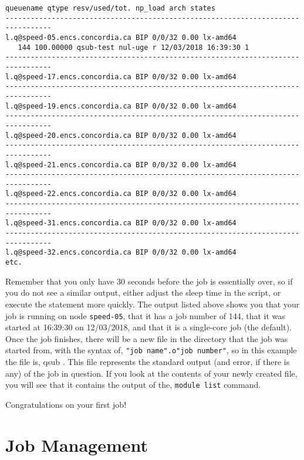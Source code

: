 \documentclass{easychair}
\begin{document}
\small
\begin{verbatim}
queuename qtype resv/used/tot. np_load arch states
--------------------------------------------------------------------------------- 
l.q@speed-05.encs.concordia.ca BIP 0/0/32 0.00 lx-amd64
   144 100.00000 qsub-test nul-uge r 12/03/2018 16:39:30 1 
--------------------------------------------------------------------------------- 
l.q@speed-17.encs.concordia.ca BIP 0/0/32 0.00 lx-amd64  
--------------------------------------------------------------------------------- 
l.q@speed-19.encs.concordia.ca BIP 0/0/32 0.00 lx-amd64  
--------------------------------------------------------------------------------- 
l.q@speed-20.encs.concordia.ca BIP 0/0/32 0.00 lx-amd64  
--------------------------------------------------------------------------------- 
l.q@speed-21.encs.concordia.ca BIP 0/0/32 0.00 lx-amd64  
--------------------------------------------------------------------------------- 
l.q@speed-22.encs.concordia.ca BIP 0/0/32 0.00 lx-amd64  
--------------------------------------------------------------------------------- 
l.q@speed-31.encs.concordia.ca BIP 0/0/32 0.00 lx-amd64  
--------------------------------------------------------------------------------- 
l.q@speed-32.encs.concordia.ca BIP 0/0/32 0.00 lx-amd64  
etc.
\end{verbatim}
\normalsize

Remember that you only have 30 seconds before the job is essentially over, so if you do not see a similar output, either adjust the sleep time in the script, or execute the  statement more quickly. The  output listed above shows you that your job is 
running on node \texttt{speed-05}, that it has a job number of 144, that it was started at 16:39:30 on 12/03/2018, and that it is a single-core job (the default).  
Once the job finishes, there will be a new file in the directory that the job was started  from, with the syntax of, \texttt{"job name".o"job number"}, so in this example the file is, qsub . This file represents the standard output (and error, if there is any) of the job in question. If you look at the contents of your newly created file, you will see that it  contains the output of the, \texttt{module list} command. 

Congratulations on your first job! 

\section{Job Management}
\end{document}
